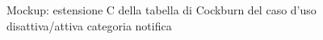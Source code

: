 \begin{figure}[ht]
    \caption{Mockup: estensione C della tabella di Cockburn del caso d'uso disattiva/attiva categoria notifica}
    \label{fig:tikz_flow}
\end{figure}

\newpage

